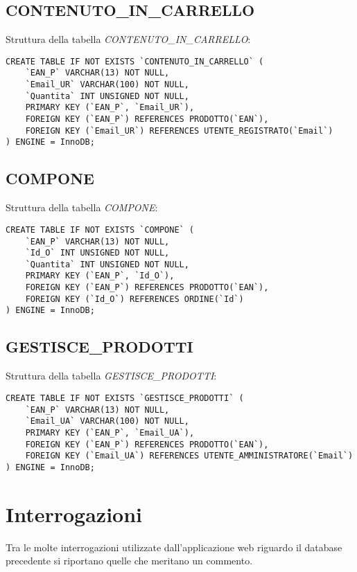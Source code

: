 \newpage

\subsection{CONTENUTO\_IN\_CARRELLO}
Struttura della tabella \emph{CONTENUTO\_IN\_CARRELLO}:

\begin{lstlisting}
CREATE TABLE IF NOT EXISTS `CONTENUTO_IN_CARRELLO` (
	`EAN_P` VARCHAR(13) NOT NULL,
	`Email_UR` VARCHAR(100) NOT NULL,
	`Quantita` INT UNSIGNED NOT NULL,
	PRIMARY KEY (`EAN_P`, `Email_UR`),
	FOREIGN KEY (`EAN_P`) REFERENCES PRODOTTO(`EAN`),
	FOREIGN KEY (`Email_UR`) REFERENCES UTENTE_REGISTRATO(`Email`)
) ENGINE = InnoDB;
\end{lstlisting}

\subsection{COMPONE}
Struttura della tabella \emph{COMPONE}:

\begin{lstlisting}
CREATE TABLE IF NOT EXISTS `COMPONE` (
	`EAN_P` VARCHAR(13) NOT NULL,
	`Id_O` INT UNSIGNED NOT NULL,
	`Quantita` INT UNSIGNED NOT NULL,
	PRIMARY KEY (`EAN_P`, `Id_O`),
	FOREIGN KEY (`EAN_P`) REFERENCES PRODOTTO(`EAN`),
	FOREIGN KEY (`Id_O`) REFERENCES ORDINE(`Id`)
) ENGINE = InnoDB;
\end{lstlisting}

\subsection{GESTISCE\_PRODOTTI}
Struttura della tabella \emph{GESTISCE\_PRODOTTI}:

\begin{lstlisting}
CREATE TABLE IF NOT EXISTS `GESTISCE_PRODOTTI` (
	`EAN_P` VARCHAR(13) NOT NULL,
	`Email_UA` VARCHAR(100) NOT NULL,
	PRIMARY KEY (`EAN_P`, `Email_UA`),
	FOREIGN KEY (`EAN_P`) REFERENCES PRODOTTO(`EAN`),
	FOREIGN KEY (`Email_UA`) REFERENCES UTENTE_AMMINISTRATORE(`Email`)
) ENGINE = InnoDB;
\end{lstlisting}

\section{Interrogazioni}
Tra le molte interrogazioni utilizzate dall'applicazione web riguardo il database precedente si riportano quelle che meritano un commento.